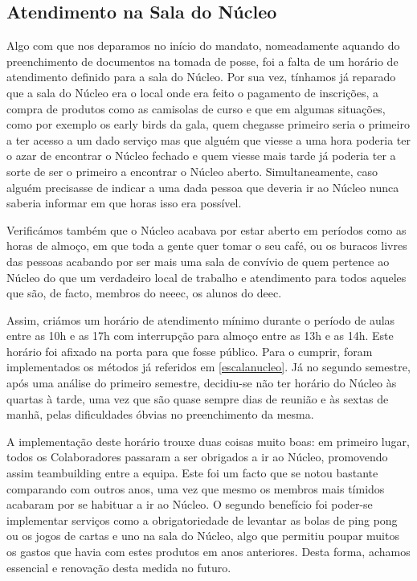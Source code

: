 
\subsection{Atendimento na Sala do Núcleo}

Algo com que nos deparamos no início do mandato, nomeadamente aquando do preenchimento de documentos na tomada de posse, foi a falta de um horário de atendimento definido para a sala do Núcleo. Por sua vez, tínhamos já reparado que a sala do Núcleo era o local onde era feito o pagamento de inscrições, a compra de produtos como as camisolas de curso e que em algumas situações, como por exemplo os early birds da gala, quem chegasse primeiro seria o primeiro a ter acesso a um dado serviço mas que alguém que viesse a uma hora poderia ter o azar de encontrar o Núcleo fechado e quem viesse mais tarde já poderia ter a sorte de ser o primeiro a encontrar o Núcleo aberto. Simultaneamente, caso alguém precisasse de indicar a uma dada pessoa que deveria ir ao Núcleo nunca saberia informar em que horas isso era possível.

Verificámos também que o Núcleo acabava por estar aberto em períodos como as horas de almoço, em que toda a gente quer tomar o seu café, ou os buracos livres das pessoas acabando por ser mais uma sala de convívio de quem pertence ao Núcleo do que um verdadeiro local de trabalho e atendimento para todos aqueles que são, de facto, membros do \acrshort{neeec}, os alunos do \acrshort{deec}.

Assim, criámos um horário de atendimento mínimo durante o período de aulas entre as 10h e as 17h com interrupção para almoço entre as 13h e as 14h. Este horário foi afixado na porta para que fosse público. Para o cumprir, foram implementados os métodos já referidos em \ref{escalanucleo}. Já no segundo semestre, após uma análise do primeiro semestre, decidiu-se não ter horário do Núcleo às quartas à tarde, uma vez que são quase sempre dias de reunião e às sextas de manhã, pelas dificuldades óbvias no preenchimento da mesma.

A implementação deste horário trouxe duas coisas muito boas: em primeiro lugar, todos os Colaboradores passaram a ser obrigados a ir ao Núcleo, promovendo assim teambuilding entre a equipa. Este foi um facto que se notou bastante comparando com outros anos, uma vez que mesmo os membros mais tímidos acabaram por se habituar a ir ao Núcleo. O segundo benefício foi poder-se implementar serviços como a obrigatoriedade de levantar as bolas de ping pong ou os jogos de cartas e uno na sala do Núcleo, algo que permitiu poupar muitos os gastos que havia com estes produtos em anos anteriores. Desta forma, achamos essencial e renovação desta medida no futuro.